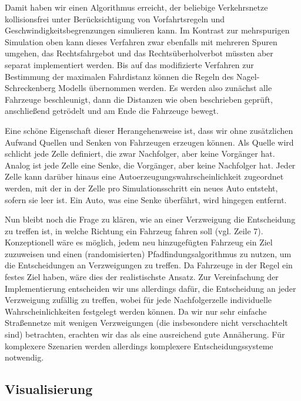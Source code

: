 \documentclass[11pt, a4paper]{article}
\begin{document}
Damit haben wir einen Algorithmus erreicht, der beliebige Verkehrsnetze kollisionsfrei unter Berücksichtigung von Vorfahrtsregeln und Geschwindigkeitsbegrenzungen simulieren kann. Im Kontrast zur mehrspurigen Simulation oben kann dieses Verfahren zwar ebenfalls mit mehreren Spuren umgehen, das Rechtsfahrgebot und das Rechtsüberholverbot müssten aber separat implementiert werden. Bis auf das modifizierte Verfahren zur Bestimmung der maximalen Fahrdistanz können die Regeln des Nagel-Schreckenberg Modells \cite{nagel-schreckenberg} übernommen werden. Es werden also zunächst alle Fahrzeuge beschleunigt, dann die Distanzen wie oben beschrieben geprüft, anschließend getrödelt und am Ende die Fahrzeuge bewegt.

Eine schöne Eigenschaft dieser Herangehensweise ist, dass wir ohne zusätzlichen Aufwand Quellen und Senken von Fahrzeugen erzeugen können. Als Quelle wird schlicht jede Zelle definiert, die zwar Nachfolger, aber keine Vorgänger hat. Analog ist jede Zelle eine Senke, die Vorgänger, aber keine Nachfolger hat. Jeder Zelle kann darüber hinaus eine Autoerzeugungswahrscheinlichkeit zugeordnet werden, mit der in der Zelle pro Simulationsschritt ein neues Auto entsteht, sofern sie leer ist. Ein Auto, was eine Senke überfährt, wird hingegen entfernt.

Nun bleibt noch die Frage zu klären, wie an einer Verzweigung die Entscheidung zu treffen ist, in welche Richtung ein Fahrzeug fahren soll (vgl. Zeile 7). Konzeptionell wäre es möglich, jedem neu hinzugefügten Fahrzeug ein Ziel zuzuweisen und einen (randomisierten) Pfadfindungsalgorithmus zu nutzen, um die Entscheidungen an Verzweigungen zu treffen. Da Fahrzeuge in der Regel ein festes Ziel haben, wäre dies der realistischste Ansatz. Zur Vereinfachung der Implementierung entscheiden wir uns allerdings dafür, die Entscheidung an jeder Verzweigung zufällig zu treffen, wobei für jede Nachfolgerzelle individuelle Wahrscheinlichkeiten festgelegt werden können. Da wir nur sehr einfache Straßennetze mit wenigen Verzweigungen (die insbesondere nicht verschachtelt sind) betrachten, erachten wir das als eine ausreichend gute Annäherung. Für komplexere Szenarien werden allerdings komplexere Entscheidungssysteme notwendig.


\subsection{Visualisierung}
\label{subsec:visualisierung}
\end{document}
